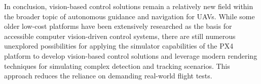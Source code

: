 In conclusion, vision-based control solutions remain a relatively new field within the broader topic of autonomous guidance and navigation for UAVs. While some older low-cost platforms have been extensively researched as the basis for accessible computer vision-driven control systems, there are still numerous unexplored possibilities for applying the simulator capabilities of the PX4 platform to develop vision-based control solutions and leverage modern rendering techniques for simulating complex detection and tracking scenarios. This approach reduces the reliance on demanding real-world flight tests.